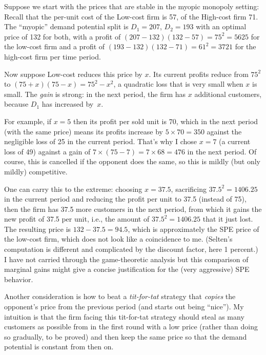\documentclass[a4paper,12pt]{article}  %
\theoremstyle{definition}
\begin{document}
Suppose we start with the prices that are stable in the
myopic monopoly setting:
Recall that the per-unit cost of the Low-cost firm is 57, of the
High-cost firm 71.
The ``myopic'' demand potential split is $D_1=207$,
$D_2=193$ with an optimal price of 132 for both, 
with a profit of $(207-132)(132-57)=75^2=5625$ for the
low-cost firm and a profit of $(193-132)(132-71)=61^2=3721$
for the high-cost firm per time period.

Now suppose Low-cost reduces this price by $x$.
Its current profits reduce from
$75^2$ to $(75+x)(75-x) = 75^2-x^2$,
a quadratic loss that is very small when $x$ is small.
The \textit{gain} is strong: in the next period, the firm
has $x$ additional customers, because $D_1$ has increased
by~$x$.

For example, if $x=5$ then its profit per sold unit
is 70, which in the next period (with the same price) means
its profits increase by $5\times70=350$ against the negligible 
loss of 25 in the current period.
That's why I chose $x=7$ (a current loss of 49) against a 
gain of $7\times(75-7)=7\times68=476$ in the next period.
Of course, this is cancelled if the opponent does the same,
so this is mildly (but only mildly) competitive.

One can carry this to the extreme: choosing $x=37.5$,
sacrificing $37.5^2=1406.25$ in the current period and
reducing the profit per unit to 37.5 (instead of 75),
then the firm has 37.5 more customers in the next period,
from which it gains the new profit of 37.5 per unit, i.e.,
the amount of $37.5^2=1406.25$ that it just lost.
The resulting price is $132-37.5 = 94.5$, which is
approximately the SPE price of the low-cost firm, which does
not look like a coincidence to me.
(Selten's computation is different and complicated by the
discount factor, here 1 percent.)
I have not carried through the game-theoretic analysis but
this comparison of marginal gains might give a concise
justification for the (very aggressive) SPE behavior.

Another consideration is how to beat a \textit{tit-for-tat}
strategy that \textit{copies} the opponent's
price from the previous period (and starts out being
``nice'').
My intuition is that the firm facing this tit-for-tat
strategy should steal as many customers as possible from in
the first round with a low price (rather than doing so
gradually, to be proved) and then keep the same price so
that the demand potential is constant from then on.
\end{document}
